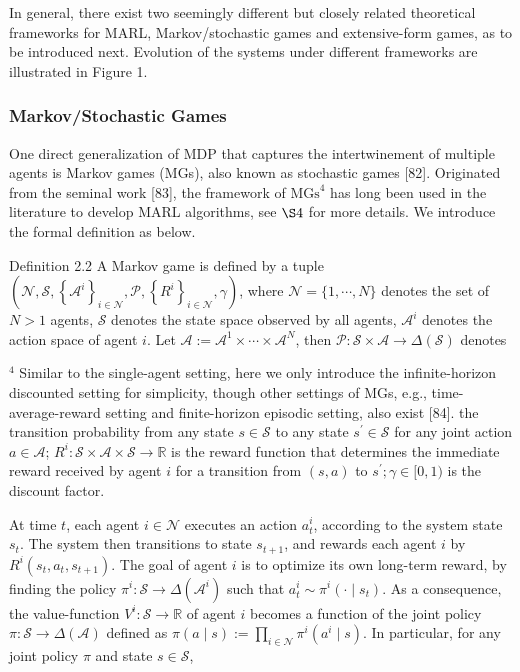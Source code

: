 \documentclass[10pt]{article}
\begin{document}
In general, there exist two seemingly different but closely related theoretical frameworks for MARL, Markov/stochastic games and extensive-form games, as to be introduced next. Evolution of the systems under different frameworks are illustrated in Figure 1.

\subsubsection{Markov/Stochastic Games}
One direct generalization of MDP that captures the intertwinement of multiple agents is Markov games (MGs), also known as stochastic games [82]. Originated from the seminal work [83], the framework of $\mathrm{MGs}^{4}$ has long been used in the literature to develop MARL algorithms, see $\S 4$ for more details. We introduce the formal definition as below.

Definition 2.2 A Markov game is defined by a tuple $\left(\mathcal{N}, \mathcal{S},\left\{\mathcal{A}^{i}\right\}_{i \in \mathcal{N}}, \mathcal{P},\left\{R^{i}\right\}_{i \in \mathcal{N}}, \gamma\right)$, where $\mathcal{N}=\{1, \cdots, N\}$ denotes the set of $N>1$ agents, $\mathcal{S}$ denotes the state space observed by all agents, $\mathcal{A}^{i}$ denotes the action space of agent $i$. Let $\mathcal{A}:=\mathcal{A}^{1} \times \cdots \times \mathcal{A}^{N}$, then $\mathcal{P}: \mathcal{S} \times \mathcal{A} \rightarrow \Delta(\mathcal{S})$ denotes

${ }^{4}$ Similar to the single-agent setting, here we only introduce the infinite-horizon discounted setting for simplicity, though other settings of MGs, e.g., time-average-reward setting and finite-horizon episodic setting, also exist [84]. the transition probability from any state $s \in \mathcal{S}$ to any state $s^{\prime} \in \mathcal{S}$ for any joint action $a \in \mathcal{A}$; $R^{i}: \mathcal{S} \times \mathcal{A} \times \mathcal{S} \rightarrow \mathbb{R}$ is the reward function that determines the immediate reward received by agent $i$ for a transition from $(s, a)$ to $s^{\prime} ; \gamma \in[0,1)$ is the discount factor.

At time $t$, each agent $i \in \mathcal{N}$ executes an action $a_{t}^{i}$, according to the system state $s_{t}$. The system then transitions to state $s_{t+1}$, and rewards each agent $i$ by $R^{i}\left(s_{t}, a_{t}, s_{t+1}\right)$. The goal of agent $i$ is to optimize its own long-term reward, by finding the policy $\pi^{i}: \mathcal{S} \rightarrow \Delta\left(\mathcal{A}^{i}\right)$ such that $a_{t}^{i} \sim \pi^{i}\left(\cdot \mid s_{t}\right)$. As a consequence, the value-function $V^{i}: \mathcal{S} \rightarrow \mathbb{R}$ of agent $i$ becomes a function of the joint policy $\pi: \mathcal{S} \rightarrow \Delta(\mathcal{A})$ defined as $\pi(a \mid s):=\prod_{i \in \mathcal{N}} \pi^{i}\left(a^{i} \mid s\right)$. In particular, for any joint policy $\pi$ and state $s \in \mathcal{S}$,
\end{document}
